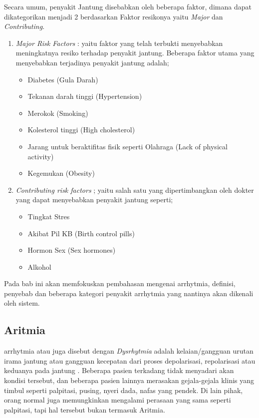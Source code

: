 Secara umum, penyakit Jantung disebabkan oleh beberapa faktor, dimana dapat 
dikategorikan menjadi 2 berdasarkan Faktor resikonya yaitu  \textit{Major} dan
\textit{Contributing}.
\begin{enumerate}
    \item \textit{Major Risk Factors} : yaitu faktor yang telah terbukti 
    menyebabkan meningkatnya resiko terhadap penyakit jantung.  Beberapa faktor
    utama yang menyebabkan terjadinya penyakit jantung adalah;
	\begin{itemize}
	    \setlength{\itemsep}{1pt}
  		\setlength{\parskip}{0pt}
  		\setlength{\parsep}{0pt}
	    \item Diabetes (Gula Darah)
	    \item Tekanan darah tinggi (Hypertension)
	    \item Merokok (Smoking)
	    \item Kolesterol tinggi (High cholesterol)
	    \item Jarang untuk beraktifitas fisik seperti Olahraga  (Lack of physical
	    activity)
	    \item Kegemukan (Obesity)
	\end{itemize}

	\item \textit{Contributing risk factors} ; yaitu salah satu  yang
	dipertimbangkan oleh dokter yang dapat menyebabkan penyakit jantung seperti;
	\begin{itemize}
	  	\setlength{\itemsep}{1pt}
		\setlength{\parskip}{0pt}
  		\setlength{\parsep}{0pt}
	    \item Tingkat Stres
	    \item Akibat Pil KB (Birth control pills)
	    \item Hormon Sex (Sex hormones)
	    \item Alkohol
	\end{itemize}
\end{enumerate}

Pada bab ini \saya akan memfokuskan pembahasan
mengenai arrhytmia, definisi, penyebab dan beberapa kategori penyakit arrhytmia
yang nantinya akan dikenali oleh sistem.

\subsection{Aritmia}
\label{ssec:Aritmia}
\Gls{arrhytmia} atau juga disebut dengan \emph{Dysrhytmia} adalah
kelaian/gangguan urutan irama jantung atau gangguan kecepatan dari proses depolarisasi, repolarisasi
atau keduanya pada jantung \cite{Karim:1996}. Beberapa pasien terkadang tidak
menyadari akan kondisi tersebut, dan beberapa pasien lainnya merasakan
gejala-gejala klinis yang timbul seperti \gls{palpitasi}, pusing, nyeri dada,
nafas yang pendek. Di lain pihak, orang normal juga memungkinkan mengalami perasaan
yang sama seperti \gls{palpitasi}, tapi hal tersebut bukan termasuk Aritmia.

